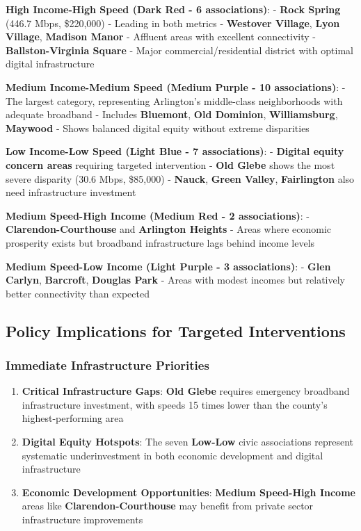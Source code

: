 \documentclass[
  letterpaper,
  DIV=11,
  numbers=noendperiod]{scrartcl}
\providecommand{\tightlist}{%
  \setlength{\itemsep}{0pt}\setlength{\parskip}{0pt}}
\begin{document}
\textbf{High Income-High Speed (Dark Red - 6 associations)}: -
\textbf{Rock Spring} (446.7 Mbps, \$220,000) - Leading in both metrics -
\textbf{Westover Village}, \textbf{Lyon Village}, \textbf{Madison Manor}
- Affluent areas with excellent connectivity - \textbf{Ballston-Virginia
Square} - Major commercial/residential district with optimal digital
infrastructure

\textbf{Medium Income-Medium Speed (Medium Purple - 10 associations)}: -
The largest category, representing Arlington's middle-class
neighborhoods with adequate broadband - Includes \textbf{Bluemont},
\textbf{Old Dominion}, \textbf{Williamsburg}, \textbf{Maywood} - Shows
balanced digital equity without extreme disparities

\textbf{Low Income-Low Speed (Light Blue - 7 associations)}: -
\textbf{Digital equity concern areas} requiring targeted intervention -
\textbf{Old Glebe} shows the most severe disparity (30.6 Mbps, \$85,000)
- \textbf{Nauck}, \textbf{Green Valley}, \textbf{Fairlington} also need
infrastructure investment

\textbf{Medium Speed-High Income (Medium Red - 2 associations)}: -
\textbf{Clarendon-Courthouse} and \textbf{Arlington Heights} - Areas
where economic prosperity exists but broadband infrastructure lags
behind income levels

\textbf{Medium Speed-Low Income (Light Purple - 3 associations)}: -
\textbf{Glen Carlyn}, \textbf{Barcroft}, \textbf{Douglas Park} - Areas
with modest incomes but relatively better connectivity than expected

\subsection{Policy Implications for Targeted
Interventions}\label{policy-implications-for-targeted-interventions}

\subsubsection{\texorpdfstring{\textbf{Immediate Infrastructure
Priorities}}{Immediate Infrastructure Priorities}}\label{immediate-infrastructure-priorities}

\begin{enumerate}
\def\labelenumi{\arabic{enumi}.}
\tightlist
\item
  \textbf{Critical Infrastructure Gaps}: \textbf{Old Glebe} requires
  emergency broadband infrastructure investment, with speeds 15 times
  lower than the county's highest-performing area
\item
  \textbf{Digital Equity Hotspots}: The seven \textbf{Low-Low} civic
  associations represent systematic underinvestment in both economic
  development and digital infrastructure
\item
  \textbf{Economic Development Opportunities}: \textbf{Medium Speed-High
  Income} areas like \textbf{Clarendon-Courthouse} may benefit from
  private sector infrastructure improvements
\end{enumerate}
\end{document}
